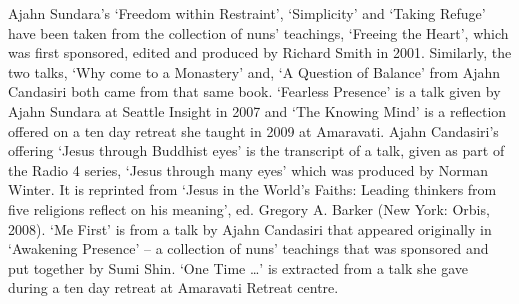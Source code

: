
Ajahn Sundara's `Freedom within Restraint', `Simplicity' and `Taking Refuge' have been taken from the collection of nuns' teachings, `Freeing the Heart', which was first sponsored, edited and produced by Richard Smith in 2001. Similarly, the two talks, `Why come to a Monastery' and, `A Question of Balance' from Ajahn Candasiri both came from that same book. `Fearless Presence' is a talk given by Ajahn Sundara at Seattle Insight in 2007 and `The Knowing Mind' is a reflection offered on a ten day retreat she taught in 2009 at Amaravati. Ajahn Candasiri's offering `Jesus through Buddhist eyes' is the transcript of a talk, given as part of the Radio 4 series, `Jesus through many eyes' which was produced by Norman Winter. It is reprinted from `Jesus in the World's Faiths: Leading thinkers from five religions reflect on his meaning', ed. Gregory A. Barker (New York: Orbis, 2008). `Me First' is from a talk by Ajahn Candasiri that appeared originally in `Awakening Presence' -- a collection of nuns' teachings that was sponsored and put together by Sumi Shin. `One Time \ldots{}' is extracted from a talk she gave during a ten day retreat at Amaravati Retreat centre.
